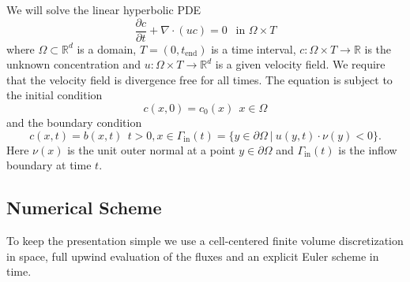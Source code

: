 \documentclass[11pt,a4paper,headinclude,footinclude,DIV16,normalheadings]{scrreprt}
\begin{document}
We will solve the linear hyperbolic PDE
\begin{equation}
\frac{\partial c}{\partial t} + \nabla\cdot (uc) = 0 \ \ \text{ in
  $\Omega\times T$}
\label{Eq:TransportEquation}
\end{equation}
where $\Omega\subset\mathbb{R}^d$ is a domain, $T=(0,t_{\text{end}})$
is a time interval,
$c:\Omega\times T\to\mathbb{R}$ is the unknown concentration and
$u:\Omega\times T\to\mathbb{R}^d$ is a given velocity field. We
require that the velocity field is divergence free for all times.
The equation is subject to the initial condition
\begin{equation}
c(x,0) = c_0(x) \ \ x\in\Omega
\end{equation}
and the boundary condition
\begin{equation}
c(x,t) = b(x,t) \ \ t>0, x\in\Gamma_{\text{in}}(t)=\{y\in\partial\Omega\
|\ u(y,t)\cdot\nu(y)<0\}. 
\end{equation}
Here $\nu(x)$ is the unit outer normal at a point $y\in\partial\Omega$
and $\Gamma_{\text{in}}(t)$ is the inflow boundary at time $t$.

\subsection{Numerical Scheme}

To keep the presentation simple we use a cell-centered finite volume
discretization in space, full upwind evaluation of the fluxes and an
explicit Euler scheme in time.
\end{document}
